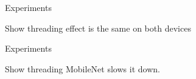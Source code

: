 \documentclass[xcolor=dvipsnames]{beamer}
\begin{document}
{ %
    \begin{frame}[plain]
     \end{frame}
}











\begin{frame}{Experiments}
    
Show threading effect is the same on both devices 
    
\end{frame}







\begin{frame}{Experiments}

Show threading MobileNet slows it down.
    
\end{frame}
\end{document}
